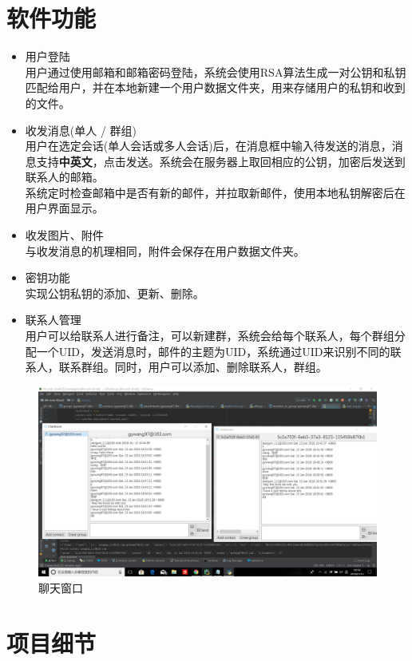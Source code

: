 \documentclass[a4paper,UTF8]{article}
\begin{document}
\section{软件功能}
\begin{itemize}
	\item 用户登陆\\
	用户通过使用邮箱和邮箱密码登陆，系统会使用RSA算法生成一对公钥和私钥匹配给用户，并在本地新建一个用户数据文件夹，用来存储用户的私钥和收到的文件。
	\item 收发消息(单人 / 群组)\\
	用户在选定会话(单人会话或多人会话)后，在消息框中输入待发送的消息，消息支持\textbf{中英文}，点击发送。系统会在服务器上取回相应的公钥，加密后发送到联系人的邮箱。\\
	系统定时检查邮箱中是否有新的邮件，并拉取新邮件，使用本地私钥解密后在用户界面显示。
	\item 收发图片、附件\\
	与收发消息的机理相同，附件会保存在用户数据文件夹。
	\item 密钥功能\\
	实现公钥私钥的添加、更新、删除。
	\item 联系人管理\\
	用户可以给联系人进行备注，可以新建群，系统会给每个联系人，每个群组分配一个UID，发送消息时，邮件的主题为UID，系统通过UID来识别不同的联系人，联系群组。同时，用户可以添加、删除联系人，群组。
\end{itemize}
\begin{figure}[H]
	\centering
	\includegraphics[width=\textwidth]{UI1.png} 
	\caption{聊天窗口}
	\label{fig:Chatting_win}
\end{figure}

\section{项目细节}
\end{document}
